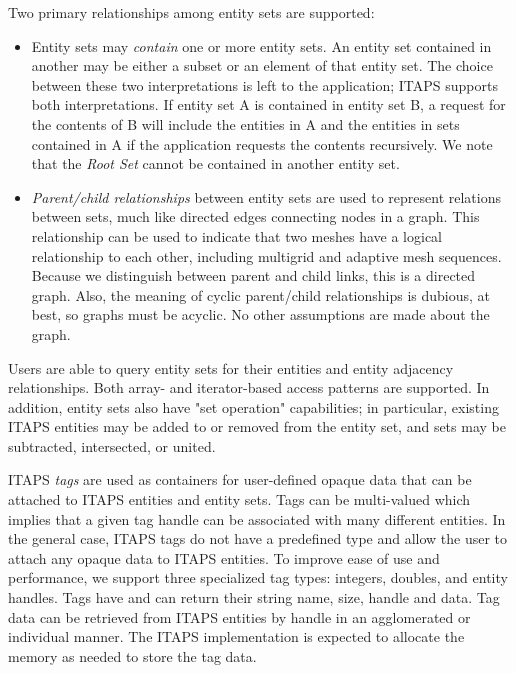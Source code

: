 Two primary relationships among entity sets are supported:

\begin{itemize}
\item Entity sets may {\it contain} one or more entity sets.  An
entity set contained in another may be either a subset or an element
of that entity set.  The choice between these two interpretations is
left to the application; ITAPS supports both interpretations. If entity
set A is contained in entity set B, a request for the contents of B
will include the entities in A and the entities in sets contained in A
if the application requests the contents recursively.  We note that
the {\it Root Set} cannot be contained in another entity set.

\item {\it Parent/child relationships} between entity sets are used to
represent relations between sets, much like directed edges connecting nodes in
a graph.  This relationship can be used to indicate that two meshes
have a logical relationship to each other, including multigrid and
adaptive mesh sequences. Because we distinguish between parent and
child links, this is a directed graph. Also, the meaning of cyclic
parent/child relationships is dubious, at best, so graphs must be
acyclic. No other assumptions are made about the graph.
\end{itemize}

Users are able to query entity sets for their entities and entity
adjacency relationships.  Both array- and iterator-based access
patterns are supported.  In addition, entity sets also have "set
operation" capabilities; in particular, existing ITAPS entities may be
added to or removed from the entity set, and sets may be subtracted,
intersected, or united.  

ITAPS {\it tags} are used as containers for user-defined opaque data that
can be attached to ITAPS entities and entity sets.  Tags can be
multi-valued which implies that a given tag handle can be associated
with many different entities.  In the general case, ITAPS tags do not
have a predefined type and allow the user to attach any opaque data to
ITAPS entities.  To improve ease of use and performance, we support
three specialized tag types: integers, doubles, and entity handles.  Tags
have and can return their string name, size, handle and data.  Tag
data can be retrieved from ITAPS entities by handle in an agglomerated
or individual manner.  The ITAPS implementation is expected to allocate
the memory as needed to store the tag data.

